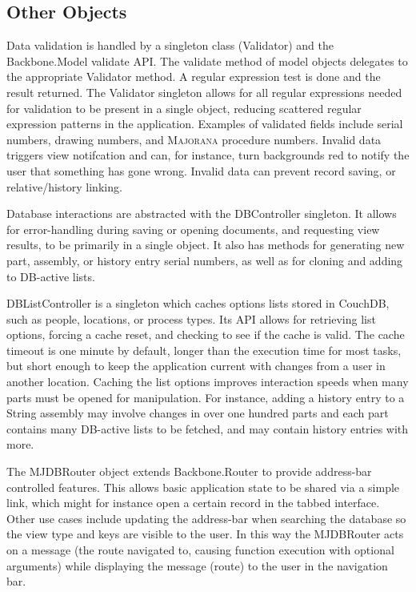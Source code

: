 \documentclass[journal]{IEEEtran}
\begin{document}
\subsection{Other Objects}
Data validation is handled by a singleton class (Validator) and the Backbone.Model validate API. The validate
method of model objects delegates to the appropriate Validator method.
A regular expression test is done and the result returned. The Validator singleton
allows for all regular expressions needed for validation to be present in a single object, reducing scattered
regular expression patterns in the application. Examples of validated fields include serial numbers, drawing numbers, and \textsc{Majorana} procedure numbers.
Invalid data triggers view notifcation and can, for instance, turn backgrounds 
red to notify the user that something has gone wrong. Invalid data can prevent record saving, or relative/history linking.

Database interactions are abstracted with the DBController singleton. It allows for error-handling during saving or 
opening documents, and requesting view results, to be primarily in a single object. It also has methods for generating new part, assembly, or history
entry serial numbers, as well as for cloning and adding to DB-active lists.

DBListController is a singleton which caches options lists stored in CouchDB, such as people, locations, or process types. Its
API allows for retrieving list options, forcing a cache reset, and checking to see if the cache is valid. The cache timeout is 
one minute by default, longer than the execution time for most tasks, but short enough to keep the application current
with changes from a user in another location. Caching the list options improves interaction speeds when many parts must be opened for manipulation. For
instance, adding a history entry to a String assembly may involve changes in over one hundred parts and each part contains many
DB-active lists to be fetched, and may contain history entries with more.

The MJDBRouter object extends Backbone.Router to provide address-bar controlled features. This allows basic application state
to be shared via a simple link, which might for instance open a certain record in the tabbed interface. Other use cases include
updating the address-bar when searching the database so the view type and keys are visible to the user. In this way the MJDBRouter
acts on a message (the route navigated to, causing function execution with optional arguments) while displaying the message (route)
to the user in the navigation bar.
\end{document}
